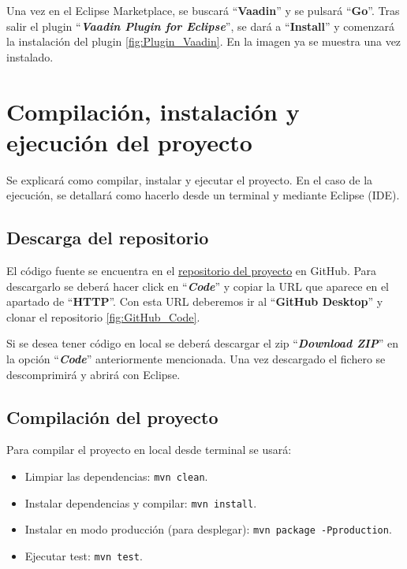 
Una vez en el Eclipse Marketplace, se buscará ``\textbf{Vaadin}'' y se pulsará ``\textbf{Go}''. Tras salir el plugin ``\textbf{\textit{Vaadin Plugin for Eclipse}}'', se dará a ``\textbf{Install}'' y comenzará la instalación del plugin \ref{fig:Plugin_Vaadin}. En la imagen ya se muestra una vez instalado.


\section{Compilación, instalación y ejecución del proyecto}

Se explicará como compilar, instalar y ejecutar el proyecto. En el caso de
la ejecución, se detallará como hacerlo desde un terminal y mediante Eclipse (IDE).

\subsection{Descarga del repositorio}
El código fuente se encuentra en el \href{https://github.com/drg1006/Gestor-TFG-2022.git}{repositorio del proyecto} en GitHub. Para descargarlo se deberá hacer click en ``\textbf{\textit{Code}}'' y copiar la URL que aparece en el apartado de ``\textbf{HTTP}''. Con esta URL deberemos ir al ``\textbf{GitHub Desktop}'' y clonar el repositorio \ref{fig:GitHub_Code}.


Si se desea tener código en local se deberá descargar el zip ``\textbf{\textit{Download ZIP}}'' en la opción ``\textbf{\textit{Code}}'' anteriormente mencionada. Una vez descargado el fichero se descomprimirá y abrirá con Eclipse. 

\subsection{Compilación del proyecto}

Para compilar el proyecto en local desde terminal se usará:
\begin{itemize}
	\item Limpiar las dependencias: \texttt{mvn clean}.
	\item Instalar dependencias y compilar: \texttt{mvn install}.
	\item Instalar en modo producción (para desplegar): \texttt{mvn package -Pproduction}.  
	\item Ejecutar test: \texttt{mvn test}.	
\end{itemize}

